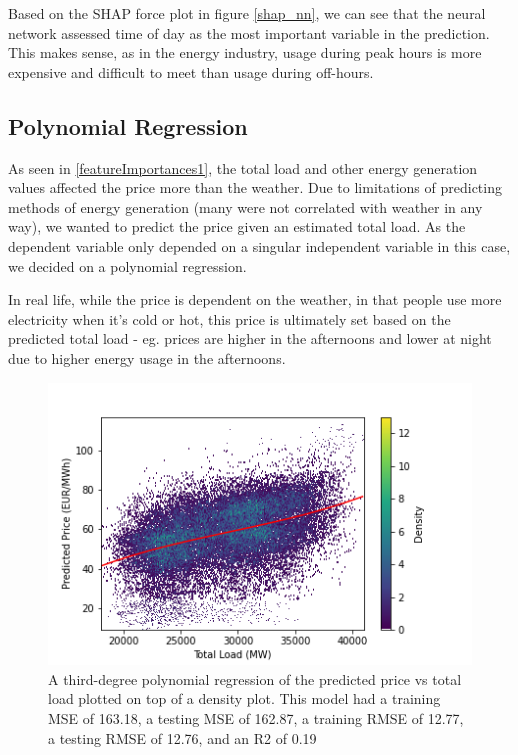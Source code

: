 \documentclass[10pt]{article}
\begin{document}
Based on the SHAP force plot in figure \ref{shap_nn}, we can see that the neural network assessed time of day as the most important variable in the prediction. This makes sense, as in the energy industry, usage during peak hours is more expensive and difficult to meet than usage during off-hours.

\subsection{Polynomial Regression}

As seen in \ref{featureImportances1}, the total load and other energy generation values affected the price more than the weather. Due to limitations of predicting methods of energy generation (many were not correlated with weather in any way), we wanted to predict the price given an estimated total load. As the dependent variable only depended on a singular independent variable in this case, we decided on a polynomial regression. 

In real life, while the price is dependent on the weather, in that people use more electricity when it’s cold or hot, this price is ultimately set based on the predicted total load - eg. prices are higher in the afternoons and lower at night due to higher energy usage in the afternoons. 

\begin{figure}[H]
    \centering
    \includegraphics[scale=0.55]{polynomial_regression.png}
    \caption{A third-degree polynomial regression of the predicted price vs total load plotted on top of a density plot. This model had a training MSE of 163.18, a testing MSE of 162.87, a training RMSE of 12.77, a testing RMSE of 12.76, and an R2 of 0.19}
    \label{polyreg}
\end{figure}
\end{document}
